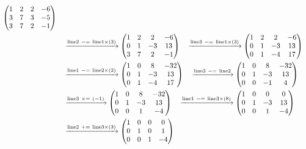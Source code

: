 \documentclass{ltjsarticle}
\begin{document}
\begin{align*}
 \begin{pmatrix}
 1 & 2 & 2 & - 6\\
 3 & 7 & 3 & - 5\\
 3 & 7 & 2 & -1
\end{pmatrix}\allowdisplaybreaks\\
 &\ \ \ \xrightarrow{ \text{line} 2 \ -=\  \text{line} 1 \times\left( 3 \right)} %
\begin{pmatrix}
 1 & 2 & 2 & - 6\\
 0 & 1 & - 3 & 13\\
 3 & 7 & 2 & -1
\end{pmatrix}\ \ \ \xrightarrow{ \text{line} 3 \ -=\  \text{line} 1 \times\left( 3 \right)} %
\begin{pmatrix}
 1 & 2 & 2 & - 6\\
 0 & 1 & - 3 & 13\\
 0 & 1 & - 4 & 17
\end{pmatrix}\allowdisplaybreaks\\
 &\ \ \ \xrightarrow{ \text{line} 1 \ -=\  \text{line} 2 \times\left( 2 \right)} %
\begin{pmatrix}
 1 & 0 & 8 & - 32\\
 0 & 1 & - 3 & 13\\
 0 & 1 & - 4 & 17
\end{pmatrix}\ \ \ \xrightarrow{ \text{line} 3 \ -=\  \text{line} 2 } %
\begin{pmatrix}
 1 & 0 & 8 & - 32\\
 0 & 1 & - 3 & 13\\
 0 & 0 & -1 & 4
\end{pmatrix}\allowdisplaybreaks\\
 &\ \ \ \xrightarrow{ \text{line} 3 \ \times=\ \left( - 1 \right)} %
\begin{pmatrix}
 1 & 0 & 8 & - 32\\
 0 & 1 & - 3 & 13\\
 0 & 0 & 1 & - 4
\end{pmatrix}\ \ \ \xrightarrow{ \text{line} 1 \ -=\  \text{line} 3 \times\left( 8 \right)} %
\begin{pmatrix}
 1 & 0 & 0 & 0\\
 0 & 1 & - 3 & 13\\
 0 & 0 & 1 & - 4
\end{pmatrix}\allowdisplaybreaks\\
 &\ \ \ \xrightarrow{ \text{line} 2 \ +=\  \text{line} 3 \times\left( 3 \right)} %
\begin{pmatrix}
 1 & 0 & 0 & 0\\
 0 & 1 & 0 & 1\\
 0 & 0 & 1 & - 4
\end{pmatrix}
\end{align*}
\end{document}
